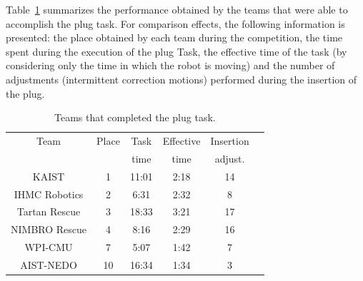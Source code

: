 		Table~\ref{tab:teams} summarizes the performance obtained by the teams that were able to
		accomplish the plug task.
		For comparison effects, the following information is presented:
		the place obtained by each team during the competition, the time spent during the execution
		of the plug Task, the effective time of the task (by considering only the time in which the
		robot is moving) and the number of adjustments (intermittent correction motions) performed
		during the insertion of the plug.
		
		\begin{table}[t]
			\caption{Teams that completed the plug task.}
			\label{tab:teams}
			\centering
			\begin{tabular}{cccccc}
				\hline
				Team 					& Place	& Task	& Effective & Insertion	\\
											& 			& time	& time			& adjust.		\\
				\hline
				KAIST					& 1			& 11:01	& 2:18			& 14				\\
				IHMC Robotics	& 2			& 6:31	& 2:32			& 8					\\
				Tartan Rescue	& 3			& 18:33	& 3:21			& 17				\\
				NIMBRO Rescue	& 4			& 8:16	& 2:29			& 16				\\
				WPI-CMU				& 7			& 5:07	& 1:42			& 7					\\
				AIST-NEDO			& 10		& 16:34	& 1:34			& 3					\\
				\hline
			\end{tabular}
		\end{table}